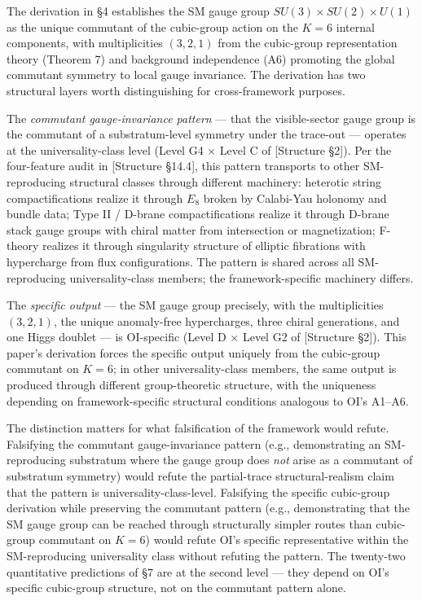 \documentclass[
]{article}
\begin{document}
The derivation in §4 establishes the SM gauge group
\(SU(3) \times SU(2) \times U(1)\) as the unique commutant of the
cubic-group action on the \(K = 6\) internal components, with
multiplicities \((3, 2, 1)\) from the cubic-group representation theory
(Theorem 7) and background independence (A6) promoting the global
commutant symmetry to local gauge invariance. The derivation has two
structural layers worth distinguishing for cross-framework purposes.

The \emph{commutant gauge-invariance pattern} --- that the
visible-sector gauge group is the commutant of a substratum-level
symmetry under the trace-out --- operates at the universality-class
level (Level G4 × Level C of {[}Structure §2{]}). Per the four-feature
audit in {[}Structure §14.4{]}, this pattern transports to other
SM-reproducing structural classes through different machinery: heterotic
string compactifications realize it through \(E_8\) broken by Calabi-Yau
holonomy and bundle data; Type II / D-brane compactifications realize it
through D-brane stack gauge groups with chiral matter from intersection
or magnetization; F-theory realizes it through singularity structure of
elliptic fibrations with hypercharge from flux configurations. The
pattern is shared across all SM-reproducing universality-class members;
the framework-specific machinery differs.

The \emph{specific output} --- the SM gauge group precisely, with the
multiplicities \((3, 2, 1)\), the unique anomaly-free hypercharges,
three chiral generations, and one Higgs doublet --- is OI-specific
(Level D × Level G2 of {[}Structure §2{]}). This paper's derivation
forces the specific output uniquely from the cubic-group commutant on
\(K = 6\); in other universality-class members, the same output is
produced through different group-theoretic structure, with the
uniqueness depending on framework-specific structural conditions
analogous to OI's A1--A6.

The distinction matters for what falsification of the framework would
refute. Falsifying the commutant gauge-invariance pattern (e.g.,
demonstrating an SM-reproducing substratum where the gauge group does
\emph{not} arise as a commutant of substratum symmetry) would refute the
partial-trace structural-realism claim that the pattern is
universality-class-level. Falsifying the specific cubic-group derivation
while preserving the commutant pattern (e.g., demonstrating that the SM
gauge group can be reached through structurally simpler routes than
cubic-group commutant on \(K = 6\)) would refute OI's specific
representative within the SM-reproducing universality class without
refuting the pattern. The twenty-two quantitative predictions of §7 are
at the second level --- they depend on OI's specific cubic-group
structure, not on the commutant pattern alone.
\end{document}
